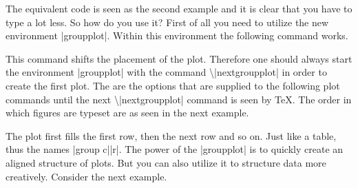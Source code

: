The equivalent code is seen as the second example and it is clear that you have to type a lot less. So how do you use it?
First of all you need to utilize the new environment |groupplot|. Within this environment the following command works.
\begin{command}{\nextgroupplot{} }
\label{cmd:pgfplots:nextgroupplot}
This command shifts the placement of the plot. Therefore one should always start the environment |groupplot| with the command
\textbackslash|nextgroupplot| in order to create the first plot. The  are the options that are supplied to the following plot commands until
the next \textbackslash|nextgroupplot| command is seen by \TeX.
The order in which figures are typeset are as seen in the next example.
\begin{codeexample}[]
\end{codeexample}
The plot first fills the first row, then the next row and so on. Just like a table, thus the names |group c||r|. The power of the |groupplot| is
to quickly create an aligned structure of plots. But you can also utilize it to structure data more creatively. Consider the next example.
\begin{codeexample}[]
\end{codeexample}


\end{command}
